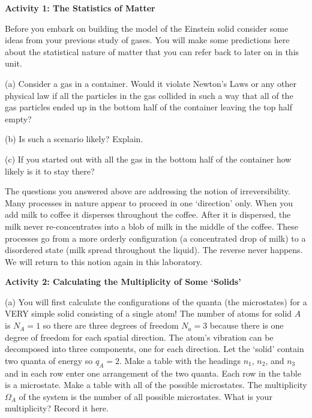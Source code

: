 \textbf{Activity 1: The Statistics of Matter}

Before you embark on building the model of the Einstein solid consider some ideas from
your previous study of gases. 
You will make some predictions here about the statistical nature of matter that you can
refer back to later on in this unit.

(a) Consider a gas in a container. Would it violate Newton's Laws or any other physical law
if all the particles in the gas collided in such a way that all of the gas particles
ended up in the bottom half of the container leaving the top half empty?
\vspace{15mm}

(b) Is such a scenario likely? Explain.
\vspace{15mm}

(c) If you started out with all the gas in the bottom half of the container how likely is
it to stay there?
\vspace{15mm}

The questions you answered above are addressing the notion of irreversibility.
Many processes in nature appear to proceed in one `direction' only.
When you add milk to coffee it disperses throughout the coffee.
After it is dispersed, the milk never re-concentrates into a blob of milk in the
middle of the coffee.
These processes go from a more orderly configuration (a concentrated drop of milk)
to a disordered state (milk spread throughout the liquid).
The reverse never happens.
We will return to this notion again in this laboratory.

\textbf{Activity 2: Calculating the Multiplicity of Some `Solids'}

(a) You will first calculate the configurations of 
the quanta (the microstates) for a VERY simple solid consisting of a single
atom!
The number of atoms for solid $A$ is $N_A=1$ so there are three degrees of
freedom $N_a=3$ because there is one degree of freedom for each
spatial direction.
The atom's vibration can be decomposed into three components, one for each direction.
Let the `solid' contain two quanta of energy so $q_A=2$.
Make a table with the headings $n_1$, $n_2$, and $n_3$ 
and in each row enter one
arrangement of the two quanta.
Each row in the table is a microstate.
Make a table with all of the possible microstates.
The multiplicity $\Omega_A$ of the system is the number of all possible
microstates. What is your multiplicity?
Record it here.
\vspace{45mm}

